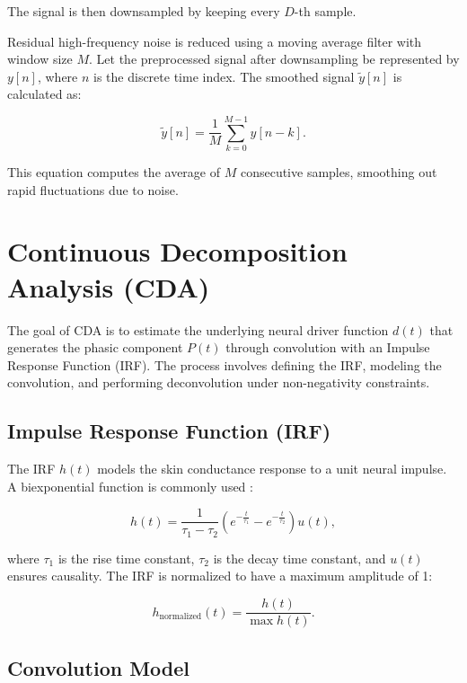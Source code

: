 \documentclass[twocolumn]{article}
\begin{document}
The signal is then downsampled by keeping every \( D \)-th sample.

Residual high-frequency noise is reduced using a moving average filter with window size \( M \). Let the preprocessed signal after downsampling be represented by \( y[n] \), where \( n \) is the discrete time index. The smoothed signal \( \tilde{y}[n] \) is calculated as:

\begin{equation}
\tilde{y}[n] = \frac{1}{M} \sum_{k=0}^{M-1} y[n - k].
\end{equation}

This equation computes the average of \( M \) consecutive samples, smoothing out rapid fluctuations due to noise.

\section*{Continuous Decomposition Analysis (CDA)}

The goal of CDA is to estimate the underlying neural driver function \( d(t) \) that generates the phasic component \( P(t) \) through convolution with an Impulse Response Function (IRF). The process involves defining the IRF, modeling the convolution, and performing deconvolution under non-negativity constraints.

\subsection*{Impulse Response Function (IRF)}

The IRF \( h(t) \) models the skin conductance response to a unit neural impulse. A biexponential function is commonly used \cite{nihDecompositionSkin}:

\begin{equation}
h(t) = \frac{1}{\tau_1 - \tau_2} \left( e^{-\frac{t}{\tau_1}} - e^{-\frac{t}{\tau_2}} \right) u(t),
\end{equation}

where \( \tau_1 \) is the rise time constant, \( \tau_2 \) is the decay time constant, and \( u(t) \) ensures causality. The IRF is normalized to have a maximum amplitude of 1:

\begin{equation}
h_{\text{normalized}}(t) = \frac{h(t)}{\max h(t)}.
\end{equation}

\subsection*{Convolution Model}
\end{document}
